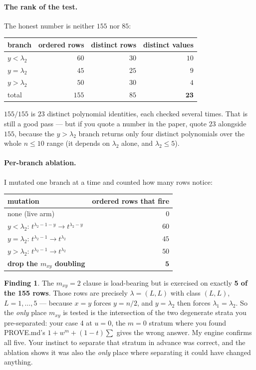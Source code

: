 \documentclass[11pt]{article}
\theoremstyle{plain}
\theoremstyle{definition}
\newtheorem{finding}[proposition]{Finding}
\newcommand{\lam}{\lambda}
\begin{document}
\paragraph{The rank of the test.} The honest number is neither $155$ nor $85$:
\begin{center}\small
\begin{tabular}{@{}lrrr@{}}
\toprule
branch & ordered rows & distinct rows & \textbf{distinct values} \\
\midrule
$y<\lam_2$ & $60$ & $30$ & $10$ \\
$y=\lam_2$ & $45$ & $25$ & $9$ \\
$y>\lam_2$ & $50$ & $30$ & $4$ \\
\midrule
total & $155$ & $85$ & $\mathbf{23}$ \\
\bottomrule
\end{tabular}
\end{center}
$155/155$ is $23$ distinct polynomial identities, each checked several times. That is still a good
pass --- but if you quote a number in the paper, quote $23$ alongside $155$, because the $y>\lam_2$
branch returns only four distinct polynomials over the whole $n\le10$ range (it depends on
$\lam_2$ alone, and $\lam_2\le5$).

\paragraph{Per-branch ablation.} I mutated one branch at a time and counted how many rows notice:
\begin{center}\small
\begin{tabular}{@{}lr@{}}
\toprule
mutation & ordered rows that fire \\
\midrule
none (live arm) & $0$ \\
$y<\lam_2$: $t^{\lam_2-1-y}\to t^{\lam_2-y}$ & $60$ \\
$y=\lam_2$: $t^{\lam_2-1}\to t^{\lam_2}$ & $45$ \\
$y>\lam_2$: $t^{\lam_2-1}\to t^{\lam_2}$ & $50$ \\
\textbf{drop the $m_{xy}$ doubling} & $\mathbf{5}$ \\
\bottomrule
\end{tabular}
\end{center}

\begin{finding}\label{f:mxy}
The $m_{xy}=2$ clause is load-bearing but is exercised on exactly \textbf{5 of the 155 rows}.
Those rows are precisely $\lam=(L,L)$ with class $(L,L)$, $L=1,\dots,5$ --- because $x=y$ forces
$y=n/2$, and $y=\lam_2$ then forces $\lam_1=\lam_2$. So the \emph{only} place $m_{xy}$ is tested
is the intersection of the two degenerate strata you pre-separated: your case 4 at $u=0$, the
$m=0$ stratum where you found PROVE.md's $1+w^m+(1-t)\sum$ gives the wrong answer. My engine
confirms all five. Your instinct to separate that stratum in advance was correct, and the ablation
shows it was also the \emph{only} place where separating it could have changed anything.
\end{finding}
\end{document}
